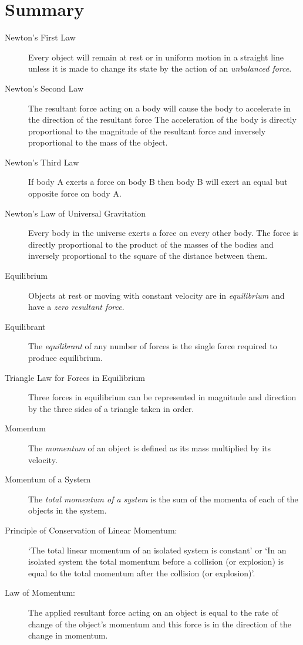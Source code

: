 \section{Summary}
\begin{description}
\item[Newton's First Law] Every object will remain at rest or in
uniform motion in a straight line unless it is made to change its
state by the action of an \emph{unbalanced force}.
\item[Newton's Second Law] The resultant force acting on a body
will cause the body to accelerate in the direction of the 
resultant force The acceleration of the body is directly proportional to the magnitude of
the resultant force and inversely proportional to the mass of the object.
\item[Newton's Third Law] If body A exerts a force on body B then body B 
will exert an equal but opposite force on body A.
\item[Newton's Law of Universal Gravitation] Every body in the universe exerts a force on every other body. The force is directly proportional to the product of the masses of the bodies and inversely proportional to the square of the distance between them.
\item[Equilibrium] Objects at rest or moving with constant velocity
are in {\em equilibrium} and have a {\em zero} {\em resultant force}.
\item[Equilibrant] The {\em equilibrant} of any number of forces is
the single force required to produce equilibrium.
\item[Triangle Law for Forces in Equilibrium] Three forces in
equilibrium can be represented in magnitude and direction by the
three sides of a triangle taken in order.
\item[Momentum] The {\em momentum} of an object is defined as its
mass multiplied by its velocity.
\item[Momentum of a System] The {\em total momentum of a system}
is the sum of the momenta of each of the objects in the system.
\item[Principle of Conservation of Linear Momentum:] `The total linear
momentum of an isolated system is constant' or `In an isolated
system the total momentum before a collision (or explosion) is equal
to the total momentum after the collision (or explosion)'.
\item[Law of Momentum:] The applied resultant force acting on an
object is equal to the rate of change of the object's momentum and
this force is in the direction of the change in momentum.
\end{description}



